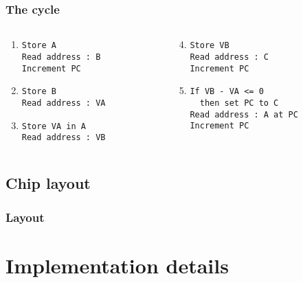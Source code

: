 \documentclass{beamer}
\begin{document}
\begin{frame}[fragile]
    \frametitle{The cycle}
\begin{columns}[t]
	\begin{column}[T]{4cm}
    \begin{enumerate}
      \setcounter{enumi}{0}
        \item
          \begin{verbatim}
Store A
Read address : B
Increment PC
          \end{verbatim}
        \item
          \begin{verbatim}
Store B
Read address : VA
          \end{verbatim}
        \item
	        \begin{verbatim}
Store VA in A
Read address : VB
          \end{verbatim}
  	\end{enumerate}
	\end{column}
	\begin{column}[T]{6cm}
  	\begin{enumerate}
  	  \setcounter{enumi}{3}
  	    \item
  	      \begin{verbatim}
Store VB
Read address : C
Increment PC
  	      \end{verbatim}
  	    \item 
  	      \begin{verbatim}
If VB - VA <= 0
  then set PC to C
Read address : A at PC
Increment PC
  	      \end{verbatim}
  	\end{enumerate}
	\end{column}
\end{columns}

\end{frame}

\subsection{Chip layout}
\begin{frame}
    \frametitle{Layout}
    \centering
    
\end{frame}

\section{Implementation details}
\end{document}
